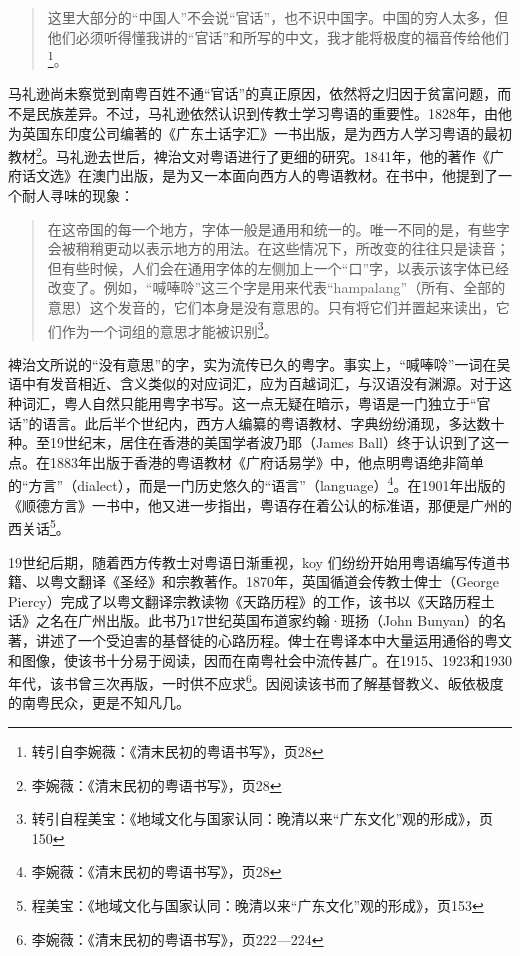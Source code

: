 \begin{quote}
这里大部分的“中国人”不会说“官话”，也不识中国字。中国的穷人太多，但他们必须听得懂我讲的“官话”和所写的中文，我才能将极度的福音传给他们\footnote{转引自李婉薇：《清末民初的粤语书写》，页28}。
\end{quote}

马礼逊尚未察觉到南粤百姓不通“官话”的真正原因，依然将之归因于贫富问题，而不是民族差异。不过，马礼逊依然认识到传教士学习粤语的重要性。1828年，由他为英国东印度公司编著的《广东土话字汇》一书出版，是为西方人学习粤语的最初教材\footnote{李婉薇：《清末民初的粤语书写》，页28}。马礼逊去世后，裨治文对粤语进行了更细的研究。1841年，他的著作《广府话文选》在澳门出版，是为又一本面向西方人的粤语教材。在书中，他提到了一个耐人寻味的现象：

\begin{quote}
在这帝国的每一个地方，字体一般是通用和统一的。唯一不同的是，有些字会被稍稍更动以表示地方的用法。在这些情况下，所改变的往往只是读音；但有些时候，人们会在通用字体的左侧加上一个“口”字，以表示该字体已经改变了。例如，“喊唪唥”这三个字是用来代表“hampalang”（所有、全部的意思）这个发音的，它们本身是没有意思的。只有将它们并置起来读出，它们作为一个词组的意思才能被识别\footnote{转引自程美宝：《地域文化与国家认同：晚清以来“广东文化”观的形成》，页150}。
\end{quote}

裨治文所说的“没有意思”的字，实为流传已久的粤字。事实上，“喊唪唥”一词在吴语中有发音相近、含义类似的对应词汇，应为百越词汇，与汉语没有渊源。对于这种词汇，粤人自然只能用粤字书写。这一点无疑在暗示，粤语是一门独立于“官话”的语言。此后半个世纪内，西方人编纂的粤语教材、字典纷纷涌现，多达数十种。至19世纪末，居住在香港的美国学者波乃耶（James Ball）终于认识到了这一点。在1883年出版于香港的粤语教材《广府话易学》中，他点明粤语绝非简单的“方言”（dialect），而是一门历史悠久的“语言”（language）\footnote{李婉薇：《清末民初的粤语书写》，页28}。在1901年出版的《顺德方言》一书中，他又进一步指出，粤语存在着公认的标准语，那便是广州的西关话\footnote{程美宝：《地域文化与国家认同：晚清以来“广东文化”观的形成》，页153}。

19世纪后期，随着西方传教士对粤语日渐重视，koy 们纷纷开始用粤语编写传道书籍、以粤文翻译《圣经》和宗教著作。1870年，英国循道会传教士俾士（George Piercy）完成了以粤文翻译宗教读物《天路历程》的工作，该书以《天路历程土话》之名在广州出版。此书乃17世纪英国布道家约翰·班扬（John Bunyan）的名著，讲述了一个受迫害的基督徒的心路历程。俾士在粤译本中大量运用通俗的粤文和图像，使该书十分易于阅读，因而在南粤社会中流传甚广。在1915、1923和1930年代，该书曾三次再版，一时供不应求\footnote{李婉薇：《清末民初的粤语书写》，页222—224}。因阅读该书而了解基督教义、皈依极度的南粤民众，更是不知凡几。


